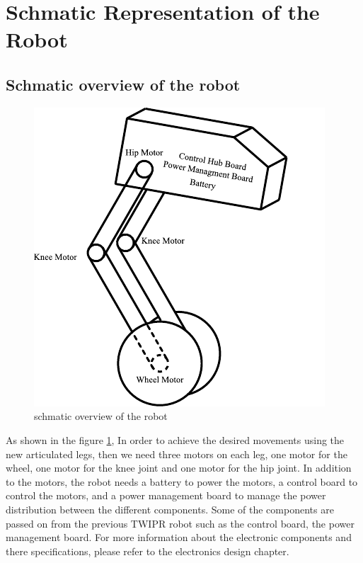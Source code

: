 \section{Schmatic Representation of the Robot}
\subsection{Schmatic overview of the robot}
\begin{figure}[h]
	\centering
	\includegraphics[width=0.5\linewidth]{schmatic overview of the robot}
	\caption[schmatic overview of the robot]{schmatic overview of the robot}
	\label{fig:schmaticoverviewoftherobot}
\end{figure}
As shown in the figure \ref{fig:schmaticoverviewoftherobot}, In order to achieve the desired movements using the new articulated legs, then we need three motors on each leg, one motor for the wheel, one motor for the knee joint and one motor for the hip joint.
In addition to the motors, the robot needs a battery to power the motors, a control board to control the motors, and a power management board to manage the power distribution between the different components. Some of the components  are passed on from the previous TWIPR robot such as the control board, the power management board. For more information about the electronic components and there specifications, please refer to the electronics design chapter.

